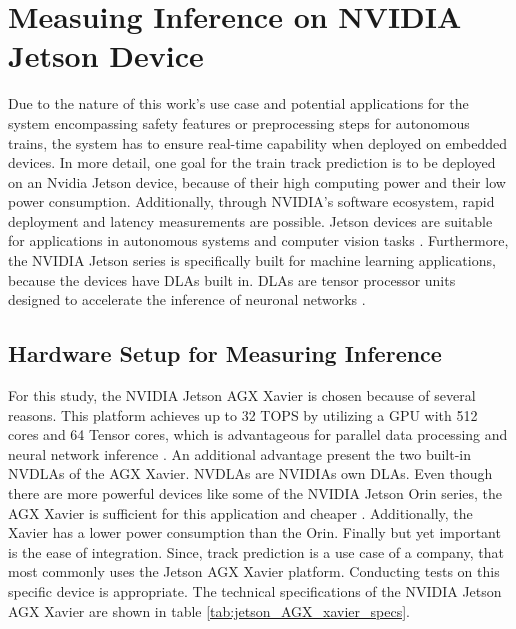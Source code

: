 \section{Measuing Inference on NVIDIA Jetson Device}
\label{sec:measuringInference}

Due to the nature of this work's use case and potential applications for the system encompassing safety features or preprocessing steps for autonomous trains, the system has to ensure real-time capability when deployed on embedded devices. 
In more detail, one goal for the train track prediction is to be deployed on an Nvidia Jetson device, because of their high computing power and their low power consumption.
Additionally, through NVIDIA's software ecosystem, rapid deployment and latency measurements are possible.
Jetson devices are suitable for applications in autonomous systems and computer vision tasks \cite{nvidia_jetson_embedded_devices}.
Furthermore, the NVIDIA Jetson series is specifically built for machine learning applications, because the devices have \ac{DLA}s built in.
\ac{DLA}s are tensor processor units designed to accelerate the inference of neuronal networks \cite{nvidia_dlas}.

\subsection{Hardware Setup for Measuring Inference}

For this study, the NVIDIA Jetson AGX Xavier is chosen because of several reasons.
This platform achieves up to 32 TOPS by utilizing a \ac{GPU} with 512 cores and 64 Tensor cores, which is advantageous for parallel data processing and neural network inference \cite{nvidia_jetson_agx_xavier_datasheet}.
An additional advantage present the two built-in \ac{NVDLA}s of the AGX Xavier.
\ac{NVDLA}s are NVIDIAs own \ac{DLA}s.
Even though there are more powerful devices like some of the NVIDIA Jetson Orin series, the AGX Xavier is sufficient for this application and cheaper \cite{nvidia_jetson_embedded_devices_prices}.
Additionally, the Xavier has a lower power consumption than the Orin.
Finally but yet important is the ease of integration.
Since, track prediction is a use case of a company, that most commonly uses the Jetson AGX Xavier platform.
Conducting tests on this specific device is appropriate.
The technical specifications of the NVIDIA Jetson AGX Xavier are shown in table \ref{tab:jetson_AGX_xavier_specs}.

